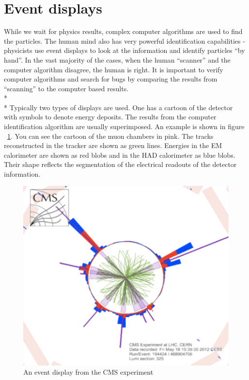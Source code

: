 \section{Event displays}
While we wait for physics results, complex computer algorithms are used to find the particles.  The human mind also has very powerful identification capabilities - physicists use event displays to look at the information and identify particles ``by hand''. In the vast majority of the cases, when the human ``scanner'' and the computer algorithm disagree, the human is right.  It is important to verify computer algorithms and search for bugs by comparing the results from ``scanning'' to the computer based results.
\\*
\\*
Typically two types of displays are used. One has a cartoon of the detector with symbols to denote energy deposits.  The results from the computer identification algorithm are usually superimposed.  An example is shown in figure ~\ref{fig:pid2}. You can see the cartoon of the muon chambers in pink. The tracks reconstructed in the tracker are shown as green lines. Energies in the EM calorimeter are shown as red blobs and in the HAD calorimeter as blue blobs. Their shape reflects the segmentation of the electrical readouts of the detector information.
\begin{figure}[h]
\centering\includegraphics[scale=0.5]{./particleID/Pictures/fig2.pdf}
\caption{An event display from the CMS experiment}
\label{fig:pid2}
\end{figure}
